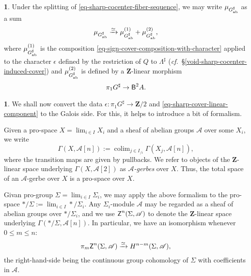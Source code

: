 \documentclass[10pt,english,reqno]{amsart}
\newcommand{\integers}{\mathbf Z}
\newcommand{\cycle}{\textnormal{\textsf{Z}}}
\newcommand{\deloop}{\textnormal{\textsf{B}}}
\DeclareMathOperator*\colim{colim}
\newcommand{\abelian}{\textnormal{ab}}
\theoremstyle{definition}
\numberwithin{equation}{section}
\newtheorem{untitledsubsubsection}[subsubsection]{}
\newenvironment{void}
{\begin{untitledsubsubsection}}
{\end{untitledsubsubsection}}
\begin{document}
\begin{void}
Under the splitting of \eqref{eq-sharp-cocenter-fiber-sequence}, we may write $\mu_{G^{\sharp}_{\abelian}}$ as a sum
\begin{equation}
\label{eq-sharp-cover-decomposition}
\mu_{G^{\sharp}_{\abelian}} \xrightarrow{\simeq} \mu_{G^{\sharp}_{\abelian}}^{(1)} + \mu_{G^{\sharp}_{\abelian}}^{(2)},
\end{equation}
where $\mu_{G^{\sharp}_{\abelian}}^{(1)}$ is the composition \eqref{eq-sign-cover-composition-with-character} applied to the character $\epsilon$ defined by the restriction of $Q$ to $\Lambda^{\sharp}$ (\emph{cf.}~\S\ref{void-sharp-cocenter-induced-cover}) and $\mu_{G^{\sharp}_{\abelian}}^{(2)}$ is defined by a $\integers$-linear morphism
\begin{equation}
\label{eq-sharp-cover-linear-component}
\pi_1G^{\sharp} \rightarrow \deloop^2 A.
\end{equation}
\end{void}


\begin{void}
\label{void-group-cochain-as-space}
We shall now convert the data $\epsilon : \pi_1G^{\sharp} \rightarrow \integers/2$ and \eqref{eq-sharp-cover-linear-component} to the Galois side. For this, it helps to introduce a bit of formalism.

Given a pro-space $X = \lim_{i\in I} X_i$ and a sheaf of abelian groups $\mathscr A$ over some $X_i$, we write
$$
\Gamma(X, \mathscr A[n]) := \colim_{j\in I_{/i}} \Gamma(X_j, \mathscr A[n]),
$$
where the transition maps are given by pullbacks. We refer to objects of the $\integers$-linear space underlying $\Gamma(X, \mathscr A[2])$ as \emph{$\mathscr A$-gerbes} over $X$. Thus, the total space of an $\mathscr A$-gerbe over $X$ is a pro-space over $X$.

Givan pro-group $\Sigma = \lim_{i\in I}\Sigma_i$, we may apply the above formalism to the pro-space $*/\Sigma := \lim_{i\in I} */\Sigma_i$. Any $\Sigma_i$-module $\mathscr A$ may be regarded as a sheaf of abelian groups over $*/\Sigma_i$, and we use $\cycle^n(\Sigma, \mathscr A)$ to denote the $\integers$-linear space underlying $\Gamma(*/\Sigma, \mathscr A[n])$.  In particular, we have an isomorphism whenever $0\le m\le n$:
$$
\pi_m \cycle^n(\Sigma, \mathscr A) \xrightarrow{\simeq} H^{n - m}(\Sigma, \mathscr A),
$$
the right-hand-side being the continuous group cohomology of $\Sigma$ with coefficients in $\mathscr A$.
\end{void}
\end{document}
